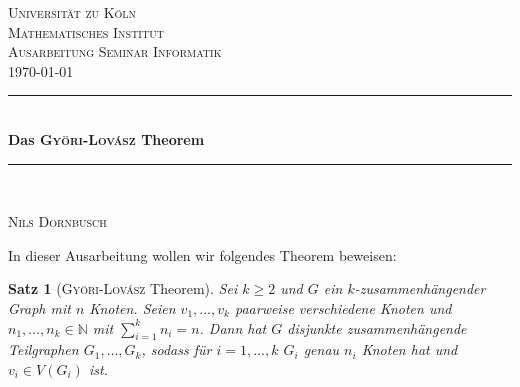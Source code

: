 \documentclass[12pt,a4paper]{scrartcl}
\numberwithin{equation}{section} %
\theoremstyle{definition}
\theoremstyle{plain}
\newtheorem{sa}[auf]{Satz}
\newcommand{\nn}{\mathbb{N}}
\begin{document}
\begin{titlepage}
\pagestyle{empty}
\begin{center}

\textsc{\LARGE Universität zu Köln }\\ [0.4cm]
\textsc{ Mathematisches Institut} \\[1.5cm]


\textsc{\Large Ausarbeitung Seminar Informatik}\\[2mm]
\textsc{\today}\\[10mm]
  

\newcommand{\HRule}{\rule{\linewidth}{0.7mm}}
\HRule \\[0.4cm]
{ \huge \bfseries Das \textsc{Györi-Lovász} Theorem}\\[0.4cm]

\HRule \\[3cm]

\begin{center}

\textsc{\Large Nils Dornbusch} \\[3pt]
\end{center}
\end{center}
\end{titlepage}
\newpage
In dieser Ausarbeitung wollen wir folgendes Theorem beweisen:
\begin{sa}[\textsc{Györi-Lovász} Theorem]
Sei $k\ge 2$ und $G$ ein $k$-zusammenhängender Graph mit $n$ Knoten. Seien $v_1,\dotsc,v_k$ paarweise verschiedene Knoten und $n_1,\dotsc,n_k\in\nn$ mit $\sum_{i=1}^kn_i=n$. Dann hat $G$ disjunkte zusammenhängende Teilgraphen $G_1,\dotsc,G_k$, sodass für $i=1,\dotsc,k$ $G_i$ genau $n_i$ Knoten hat und $v_i\in V(G_i)$ ist.
\end{sa}
\end{document}
